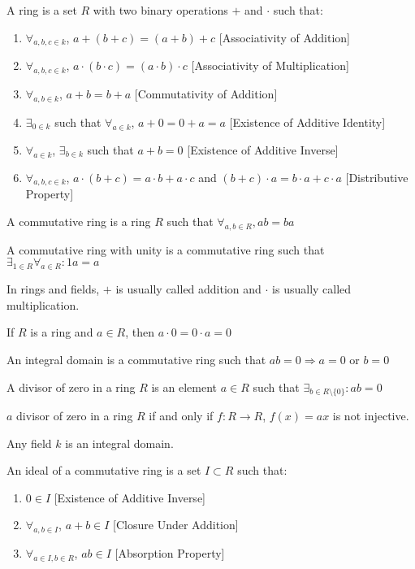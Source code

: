\documentclass[crop=false,class=book]{standalone}
\begin{document}
\begin{definition}
A ring is a set $R$ with two binary operations $+$ and $\cdot$ such that:
\begin{enumerate}
    \item $\forall_{a,b,c\in k}$, $a+(b+c)=(a+b)+c$ \hfill [Associativity of Addition]
    \item $\forall_{a,b,c\in k}$, $a\cdot(b\cdot c) = (a\cdot b)\cdot c$ \hfill [Associativity of Multiplication]
    \item $\forall_{a,b\in k}$, $a+b=b+a$ \hfill [Commutativity of Addition]
    \item $\exists_{0 \in k}$ such that $\forall_{a\in k}$, $a+0=0+a = a$ \hfill [Existence of Additive Identity]
    \item $\forall_{a\in k}$, $\exists_{b\in k}$ such that $a+b=0$ \hfill [Existence of Additive Inverse]
    \item $\forall_{a,b,c\in k}$, $a\cdot(b+c) = a\cdot b + a\cdot c$ and $(b+c)\cdot a = b\cdot a + c\cdot a$ \hfill [Distributive Property]
\end{enumerate}
\end{definition}
\begin{definition}
A commutative ring is a ring $R$ such that $\forall_{a,b\in R},ab=ba$
\end{definition}
\begin{definition}
A commutative ring with unity is a commutative ring such that $\exists_{1\in R}\forall_{a\in R}:1a=a$
\end{definition}
\begin{remark}
In rings and fields, $+$ is usually called addition and $\cdot$ is usually called multiplication.
\end{remark}
\begin{corollary}
If $R$ is a ring and $a\in R$, then $a\cdot 0 = 0\cdot a=0$
\end{corollary}
\begin{definition}
An integral domain is a commutative ring such that $ab=0\Rightarrow a=0$ or $b=0$
\end{definition}
\begin{definition}
A divisor of zero in a ring $R$ is an element $a\in R$ such that $\exists_{b\in R\setminus\{0\}}:ab=0$
\end{definition}
\begin{theorem}
$a$ divisor of zero in a ring $R$ if and only if $f:R\rightarrow R$, $f(x) = ax$ is not injective.
\end{theorem}
\begin{theorem}
Any field $k$ is an integral domain.
\end{theorem}
\begin{definition}
An ideal of a commutative ring is a set $I\subset R$ such that:
\begin{enumerate}
    \item $0\in I$ \hfill [Existence of Additive Inverse]
    \item $\forall_{a,b\in I}$, $a+b\in I$ \hfill [Closure Under Addition]
    \item $\forall_{a\in I,b\in R}$, $a b \in I$ \hfill [Absorption Property]
\end{enumerate}
\end{definition}
\end{document}

